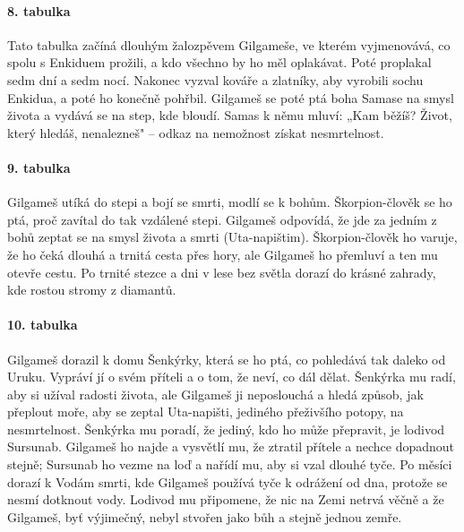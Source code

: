 \documentclass[12pt, a4paper]{article}
\begin{document}
\paragraph{8. tabulka}
Tato tabulka začíná dlouhým žalozpěvem Gilgameše, ve kterém vyjmenovává, co spolu s Enkiduem prožili, a kdo všechno by ho měl oplakávat. Poté proplakal sedm dní a sedm nocí. Nakonec vyzval kováře a zlatníky, aby vyrobili sochu Enkidua, a poté ho konečně pohřbil. Gilgameš se poté ptá boha Samase na smysl života a vydává se na step, kde bloudí. Samas k němu mluví: „Kam běžíš? Život, který hledáš, nenalezneš" -- odkaz na nemožnost získat nesmrtelnost.

\paragraph{9. tabulka}
Gilgameš utíká do stepi a bojí se smrti, modlí se k bohům. Škorpion-člověk se ho ptá, proč zavítal do tak vzdálené stepi. Gilgameš odpovídá, že jde za jedním z bohů zeptat se na smysl života a smrti (Uta-napištim). Škorpion-člověk ho varuje, že ho čeká dlouhá a trnitá cesta přes hory, ale Gilgameš ho přemluví a ten mu otevře cestu. Po trnité stezce a dni v lese bez světla dorazí do krásné zahrady, kde rostou stromy z diamantů.

\paragraph{10. tabulka}
Gilgameš dorazil k domu Šenkýrky, která se ho ptá, co pohledává tak daleko od Uruku. Vypráví jí o svém příteli a o tom, že neví, co dál dělat. Šenkýrka mu radí, aby si užíval radosti života, ale Gilgameš ji neposlouchá a hledá způsob, jak přeplout moře, aby se zeptal Uta-napišti, jediného přeživšího potopy, na nesmrtelnost. Šenkýrka mu poradí, že jediný, kdo ho může přepravit, je lodivod Sursunab. Gilgameš ho najde a vysvětlí mu, že ztratil přítele a nechce dopadnout stejně; Sursunab ho vezme na loď a nařídí mu, aby si vzal dlouhé tyče. Po měsíci dorazí k Vodám smrti, kde Gilgameš používá tyče k odrážení od dna, protože se nesmí dotknout vody. Lodivod mu připomene, že nic na Zemi netrvá věčně a že Gilgameš, byť výjimečný, nebyl stvořen jako bůh a stejně jednou zemře.
\end{document}
